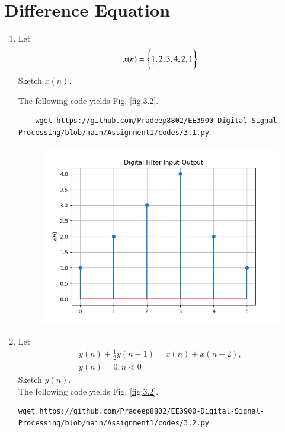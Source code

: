 \documentclass[journal,12pt,twocolumn]{IEEEtran}
\renewcommand\thesection{\arabic{section}}
\begin{document}
\section{Difference Equation}
\begin{enumerate}[label=\thesection.\arabic*,ref=\thesection.\theenumi]
\item Let
\label{def:xn}
\begin{equation}
x(n) = \left\{\underset{\uparrow}{1},2,3,4,2,1\right\}
\end{equation}
Sketch $x(n)$.

\solution The following code yields Fig. \ref{fig:3.2}.
\begin{lstlisting}
	wget https://github.com/Pradeep8802/EE3900-Digital-Signal-Processing/blob/main/Assignment1/codes/3.1.py
\end{lstlisting} 
	\begin{figure}[!ht]
	\begin{center}
		\includegraphics[width=\columnwidth]{./figs/3.1}
	\end{center}
	\label{fig:3.1}	
\end{figure}
\item Let
\begin{multline}
\label{eq:iir_filter}
y(n) + \frac{1}{2}y(n-1) = x(n) + x(n-2), 
\\
 y(n) = 0, n < 0
\end{multline}
Sketch $y(n)$.
\\
\solution The following code yields Fig. \ref{fig:3.2}.
\begin{lstlisting}
wget https://github.com/Pradeep8802/EE3900-Digital-Signal-Processing/blob/main/Assignment1/codes/3.2.py

\end{lstlisting}
\end{enumerate}
\end{document}
